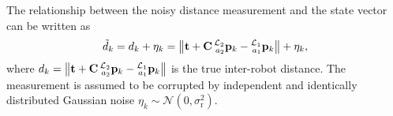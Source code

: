 \documentclass[journal]{IEEEtran}
\newcommand{\norm}[1]{\left\lVert#1\right\rVert}
\def\LocPosHost{\prescript{\mathcal{L}_1}{a_1}{\mathbf{p}}} %
\def\LocPosTarg{\prescript{\mathcal{L}_2}{a_2}{\mathbf{p}}} %
\def\AlignedPosTarg{\mathbf{C} \prescript{\mathcal{L}_2}{a_2}{\mathbf{p}}} %
\begin{document}
The relationship between the noisy distance measurement and the state vector can be written as
\begin{equation}
    \tilde{d}_k = d_k + \eta_k 
    = \norm{\mathbf{t} + \AlignedPosTarg_k - \LocPosHost_k} + \eta_k,
\end{equation}
where ${d_k = \norm{\mathbf{t} + \AlignedPosTarg_k - \LocPosHost_k}}$ is the true inter-robot distance. The measurement is assumed to be corrupted by independent and identically distributed Gaussian noise $\eta_k \sim \mathcal{N}(0, \sigma_{\textrm{r}}^2)$. %

\end{document}
